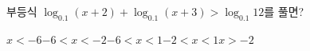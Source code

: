 부등식 $\log_{0.1}(x+2)+\log_{0.1}(x+3)>\log_{0.1}12$를 풀면?
\begin{choicesii}{$x<-6$}{$-6<x<-2$}{$-6<x<1$}{$-2<x<1$}{$x>-2$}\end{choicesii}
